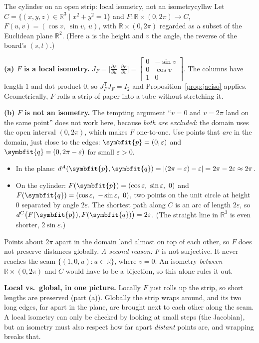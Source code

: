 \documentclass[11pt]{article}
\newcommand{\bm}[1]{\symbfit{#1}}
\newcommand{\R}{\mathbb{R}}
\newcommand{\T}{^{\mathsf T}}
\begin{document}
\begin{example}{The cylinder on an open strip: local isometry, not an isometry}{cylhw}
Let $C=\{(x,y,z)\in\R^3\mid x^2+y^2=1\}$ and $F:\R\times(0,2\pi)\to C$, $F(u,v)=(\cos v,\ \sin v,\ u)$, with $\R\times(0,2\pi)$ regarded as a subset
of the Euclidean plane $\R^2$. (Here $u$ is the height and $v$ the angle, the reverse of the board's $(s,t)$.)

\textbf{(a) $F$ is a local isometry.} $J_F=\Big[\frac{\partial F}{\partial u}\ \ \frac{\partial F}{\partial v}\Big]=\begin{bmatrix}0&-\sin v\\0&\cos v\\1&0\end{bmatrix}$. The columns have length $1$ and
dot product $0$, so $J_F\T J_F=I_2$ and Proposition~\ref{prop:jaciso} applies. Geometrically, $F$ rolls a strip of paper into a tube
without stretching it.

\textbf{(b) $F$ is not an isometry.} The tempting argument ``$v=0$ and $v=2\pi$ land on the same point'' does not work
here, because \emph{both are excluded}: the domain uses the open interval $(0,2\pi)$, which makes $F$ one-to-one. Use points
that \emph{are} in the domain, just close to the edges: $\bm p=(0,\varepsilon)$ and $\bm q=(0,2\pi-\varepsilon)$ for small $\varepsilon>0$.
\begin{itemize}[nosep]
\item In the plane: $d^A(\bm p,\bm q)=|(2\pi-\varepsilon)-\varepsilon|=2\pi-2\varepsilon\approx2\pi$.
\item On the cylinder: $F(\bm p)=(\cos\varepsilon,\ \sin\varepsilon,\ 0)$ and $F(\bm q)=(\cos\varepsilon,\ -\sin\varepsilon,\ 0)$, two points on the unit circle at height $0$
separated by angle $2\varepsilon$. The shortest path along $C$ is an arc of length $2\varepsilon$, so $d^C\big(F(\bm p),F(\bm q)\big)=2\varepsilon$. (The straight line
in $\R^3$ is even shorter, $2\sin\varepsilon$.)
\end{itemize}
Points about $2\pi$ apart in the domain land almost on top of each other, so $F$ does not preserve distances globally.
\emph{A second reason:} $F$ is not surjective. It never reaches the seam $\{(1,0,u):u\in\R\}$, where $v=0$. An isometry \emph{between}
$\R\times(0,2\pi)$ and $C$ would have to be a bijection, so this alone rules it out.
\end{example}

\begin{intuition}
\textbf{Local vs.\ global, in one picture.} Locally $F$ just rolls up the strip, so short lengths are preserved (part (a)).
Globally the strip wraps around, and its two long edges, far apart in the plane, are brought next to each other along
the seam. A local isometry can only be checked by looking at small steps (the Jacobian), but an isometry must also respect
how far apart \emph{distant} points are, and wrapping breaks that.
\end{intuition}
\end{document}
